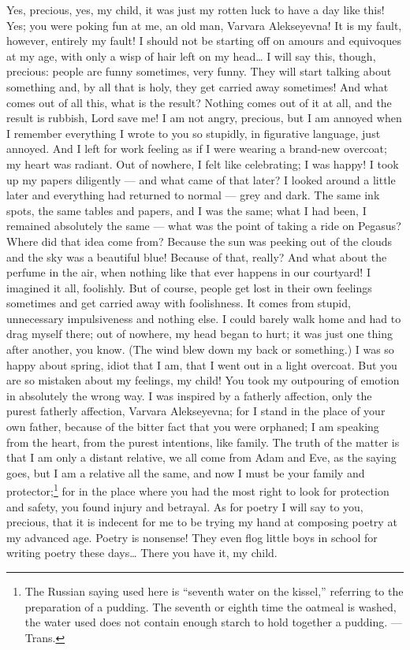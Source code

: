 Yes, precious, yes, my child, it was just my rotten luck to have a day like this! Yes; you were poking fun at me, an old man, Varvara Alekseyevna! It is my fault, however, entirely my fault! I should not be starting off on amours and equivoques at my age, with only a wisp of hair left on my head\ldots{} I will say this, though, precious: people are funny sometimes, very funny. They will start talking about something and, by all that is holy, they get carried away sometimes! And what comes out of all this, what is the result? Nothing comes out of it at all, and the result is rubbish, Lord save me! I am not angry, precious, but I am annoyed when I remember everything I wrote to you so stupidly, in figurative language, just annoyed. And I left for work feeling as if I were wearing a brand-new overcoat; my heart was radiant. Out of nowhere, I felt like celebrating; I was happy! I took up my papers diligently --- and what came of that later? I looked around a little later and everything had returned to normal --- grey and dark. The same ink spots, the same tables and papers, and I was the same; what I had been, I remained absolutely the same --- what was the point of taking a ride on Pegasus? Where did that idea come from? Because the sun was peeking out of the clouds and the sky was a beautiful blue! Because of that, really? And what about the perfume in the air, when nothing like that ever happens in our courtyard! I imagined it all, foolishly. But of course, people get lost in their own feelings sometimes and get carried away with foolishness. It comes from stupid, unnecessary impulsiveness and nothing else. I could barely walk home and had to drag myself there; out of nowhere, my head began to hurt; it was just one thing after another, you know. (The wind blew down my back or something.) I was so happy about spring, idiot that I am, that I went out in a light overcoat. But you are so mistaken about my feelings, my child! You took my outpouring of emotion in absolutely the wrong way. I was inspired by a fatherly affection, only the purest fatherly affection, Varvara Alekseyevna; for I stand in the place of your own father, because of the bitter fact that you were orphaned; I am speaking from the heart, from the purest intentions, like family. The truth of the matter is that I am only a distant relative, we all come from Adam and Eve, as the saying goes, but I am a relative all the same, and now I must be your family and protector;\footnote{The Russian saying used here is ``seventh water on the kissel,'' referring to the preparation of a pudding. The seventh or eighth time the oatmeal is washed, the water used does not contain enough starch to hold together a pudding. --- Trans.} for in the place where you had the most right to look for protection and safety, you found injury and betrayal. As for poetry I will say to you, precious, that it is indecent for me to be trying my hand at composing poetry at my advanced age. Poetry is nonsense! They even flog little boys in school for writing poetry these days\ldots{} There you have it, my child.


